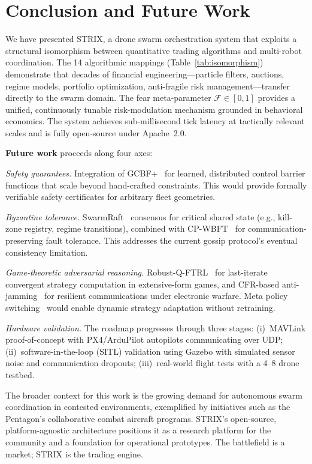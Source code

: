 \documentclass[conference]{IEEEtran}
\newcommand{\fear}{\mathcal{F}}
\begin{document}
\section{Conclusion and Future Work}
\label{sec:conclusion}

We have presented STRIX, a drone swarm orchestration system that
exploits a structural isomorphism between quantitative trading
algorithms and multi-robot coordination.  The 14 algorithmic mappings
(Table~\ref{tab:isomorphism}) demonstrate that decades of financial
engineering---particle filters, auctions, regime models, portfolio
optimization, anti-fragile risk management---transfer directly to the
swarm domain.  The fear meta-parameter $\fear\in[0,1]$ provides a
unified, continuously tunable risk-modulation mechanism grounded in
behavioral economics.  The system achieves sub-millisecond tick
latency at tactically relevant scales and is fully open-source under
Apache~2.0.

\textbf{Future work} proceeds along four axes:

\emph{Safety guarantees.}\quad
Integration of GCBF+~\cite{gao2025gcbf} for learned, distributed
control barrier functions that scale beyond hand-crafted constraints.
This would provide formally verifiable safety certificates for
arbitrary fleet geometries.

\emph{Byzantine tolerance.}\quad
SwarmRaft~\cite{swarmraft2025} consensus for critical shared state
(e.g., kill-zone registry, regime transitions), combined with
CP-WBFT~\cite{cpwbft2025} for communication-preserving fault
tolerance.  This addresses the current gossip protocol's eventual
consistency limitation.

\emph{Game-theoretic adversarial reasoning.}\quad
Robust-Q-FTRL~\cite{robust_q_ftrl2025} for last-iterate convergent
strategy computation in extensive-form games, and CFR-based
anti-jamming~\cite{cfr_antijamming2025} for resilient
communications under electronic warfare.  Meta policy
switching~\cite{metapolicy2025} would enable dynamic strategy
adaptation without retraining.

\emph{Hardware validation.}\quad
The roadmap progresses through three stages:
(i)~MAVLink proof-of-concept with PX4/ArduPilot autopilots
communicating over UDP;
(ii)~software-in-the-loop (SITL) validation using Gazebo with
simulated sensor noise and communication dropouts;
(iii)~real-world flight tests with a 4--8 drone testbed.

The broader context for this work is the growing demand for
autonomous swarm coordination in contested environments, exemplified
by initiatives such as the Pentagon's collaborative combat aircraft
programs.  STRIX's open-source, platform-agnostic architecture
positions it as a research platform for the community and a
foundation for operational prototypes.  The battlefield is a market;
STRIX is the trading engine.



\end{document}

